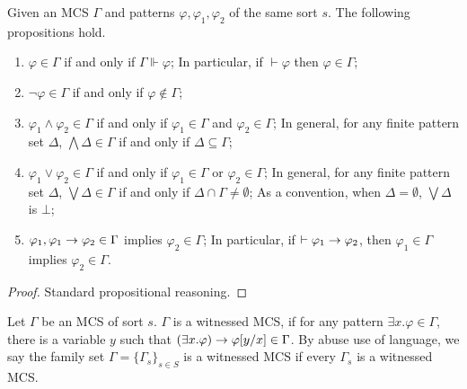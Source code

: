 \documentclass{amsart}
\begin{document}
\begin{proposition}
\label{prop_properties_of_MCS}
Given an MCS $\Gamma$
and patterns $\varphi, \varphi_1, \varphi_2$ of the same sort $s$.
The following propositions hold.
\begin{enumerate}
\item $\varphi \in \Gamma$ if and only if $\Gamma \Vdash \varphi$;
      In particular, if $\vdash \varphi$ then $\varphi \in \Gamma$;
\item $\neg \varphi \in \Gamma$ if and only if $\varphi \not\in \Gamma$;
\item $\varphi_1 \wedge \varphi_2 \in \Gamma$
      if and only if $\varphi_1 \in \Gamma$ and $\varphi_2 \in \Gamma$;
      In general, for any finite pattern set $\Delta$,
      $\bigwedge \Delta \in \Gamma$ if and only if
      $\Delta \subseteq \Gamma$;
\item $\varphi_1 \vee \varphi_2 \in \Gamma$
      if and only if $\varphi_1 \in \Gamma$ or $\varphi_2 \in \Gamma$;
      In general, for any finite pattern set $\Delta$,
      $\bigvee \Delta \in \Gamma$ if and only if
      $\Delta \cap \Gamma \neq \emptyset$;
      As a convention,
      when $\Delta = \emptyset$,
      $\bigvee \Delta$ is $\bot$;
\item $\varphi_1, \varphi_1 \to \varphi_2 \in \Gamma$ implies
      $\varphi_2 \in \Gamma$;
      In particular, if $\vdash \varphi_1 \to \varphi_2$,
      then $\varphi_1 \in \Gamma$ implies $\varphi_2 \in \Gamma$.
\end{enumerate}
\end{proposition}
\begin{proof}
Standard propositional reasoning.
\end{proof}

\begin{definition}
Let $\Gamma$ be an MCS of sort $s$.
$\Gamma$ is a witnessed MCS,
if for any pattern $\exists x . \varphi \in \Gamma$, 
there is a variable $y$ such that
$(\exists x . \varphi) \to \varphi[y/x] \in \Gamma$.
By abuse use of language, 
we say the family set $\Gamma = \{ \Gamma_s \}_{s \in S}$ is a witnessed MCS
if every $\Gamma_s$ is a witnessed MCS.
\end{definition}
\end{document}
